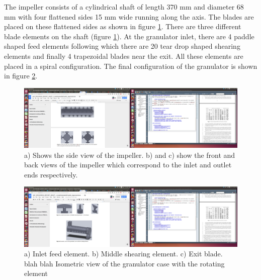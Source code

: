\documentclass[preprint,11pt,authoryear]{elsarticle}
\begin{document}
    \par  The impeller consists of a cylindrical shaft of length 370 mm and diameter 68 mm with four flattened sides 15 mm wide running along the axis. The blades are placed on these flattened sides as shown in figure \ref{fig:mthds_dem_charles_impeller}. There are three different blade elements on the shaft (figure \ref{fig:mthds_dem_charles_impeller}). At the granulator inlet, there are 4 paddle shaped feed elements following which there are 20 tear drop shaped shearing elements  and finally 4 trapezoidal blades near the exit. All these elements are placed in a spiral configuration. The final configuration of the granulator is shown in figure \ref{fig:mthds_dem_charles_fig5pt3and4_blades_n_isometric}.

      \begin{figure}[H]
      \centering
      \includegraphics[scale=0.1]{mthds_dem_charles_fig5pt2_impeller}
      \caption{a) Shows the side view of the impeller. b) and c) show the front and back views of the impeller which correspond to the inlet and outlet ends respectively.}
      \label{fig:mthds_dem_charles_impeller}
      \end{figure}    
    
      \begin{figure}[H]
      \centering
      \includegraphics[scale=0.1]{mthds_dem_charles_fig5pt3and4_blades_n_isometric}
      \caption{a) Inlet feed element. b) Middle shearing element.  c) Exit blade. blah blah Isometric view of the granulator case with the rotating element }
      \label{fig:mthds_dem_charles_fig5pt3and4_blades_n_isometric}
      \end{figure}     
    
\end{document}
